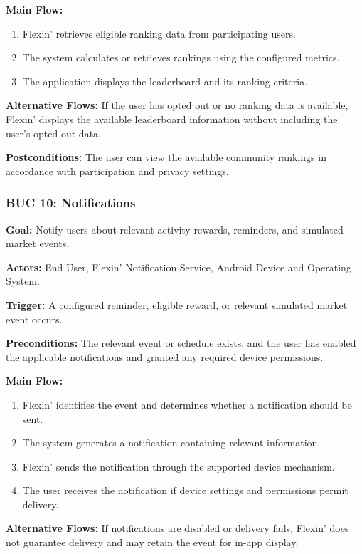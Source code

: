 \documentclass[12pt]{article}
\begin{document}
\textbf{Main Flow:}
\begin{enumerate}
    \item Flexin' retrieves eligible ranking data from participating users.
    \item The system calculates or retrieves rankings using the configured metrics.
    \item The application displays the leaderboard and its ranking criteria.
\end{enumerate}

\textbf{Alternative Flows:} If the user has opted out or no ranking data is
available, Flexin' displays the available leaderboard information without
including the user's opted-out data.

\textbf{Postconditions:} The user can view the available community rankings
in accordance with participation and privacy settings.

\subsubsection*{BUC 10: Notifications}

\textbf{Goal:} Notify users about relevant activity rewards, reminders, and
simulated market events.

\textbf{Actors:} End User, Flexin' Notification Service, Android Device and Operating System.

\textbf{Trigger:} A configured reminder, eligible reward, or relevant
simulated market event occurs.

\textbf{Preconditions:} The relevant event or schedule exists, and the user
has enabled the applicable notifications and granted any required device
permissions.

\textbf{Main Flow:}
\begin{enumerate}
    \item Flexin' identifies the event and determines whether a notification
    should be sent.
    \item The system generates a notification containing relevant information.
    \item Flexin' sends the notification through the supported device mechanism.
    \item The user receives the notification if device settings and permissions
    permit delivery.
\end{enumerate}

\textbf{Alternative Flows:} If notifications are disabled or delivery fails,
Flexin' does not guarantee delivery and may retain the event for in-app display.
\end{document}
